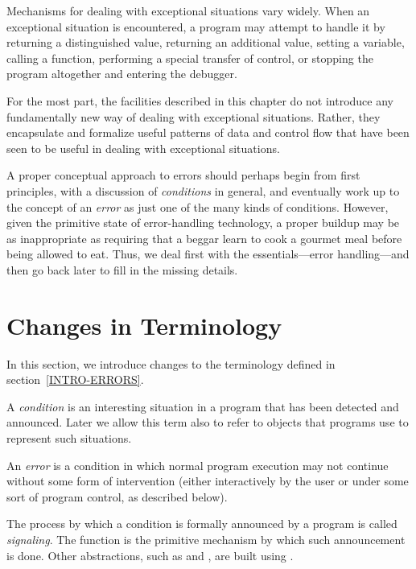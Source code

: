 Mechanisms for dealing with exceptional situations vary widely. When an
exceptional situation is encountered, a program may attempt to handle
it by returning a distinguished value, returning an additional value,
setting a variable, calling a function, performing a special transfer of
control, or stopping the program altogether and entering the debugger.

For the most part, the facilities described in this chapter do not introduce
any fundamentally new way of dealing with exceptional situations. Rather, they
encapsulate and formalize useful patterns of data and control flow that have
been seen to be useful in dealing with exceptional situations.

A proper conceptual approach to errors should perhaps begin from first
principles, with a discussion of {\it conditions} in general, and eventually work
up to the concept of an {\it error} as just one of the many kinds of
conditions. However, given the primitive state of error-handling
technology, a proper buildup may be as inappropriate as requiring that a
beggar learn to cook a gourmet meal before being allowed to eat.  Thus,
we deal first with the essentials---error handling---and then
go back later to fill in the missing details.

\section{Changes in Terminology}

In this section, we introduce changes to the terminology
defined in section~\ref{INTRO-ERRORS}.

A {\it condition} is an interesting situation in a program that has been
detected and announced. Later we allow this term also to refer to
objects that programs use to represent such situations.

An {\it error} is a condition in which normal program execution may not
continue without some form of intervention (either interactively by the user
or under some sort of program control, as described below).

The process by which a condition is formally announced by a program is called
{\it signaling}. The function  is the primitive mechanism by which such
announcement is done. Other abstractions, such as  and , are built
using .

